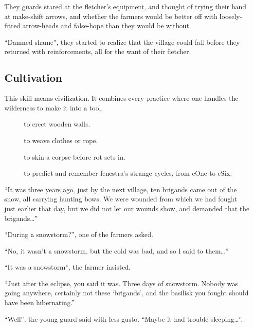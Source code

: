 \begin{multicols}{2}
\begin{exampletext}
  They \glspl{guard} stared at the fletcher's equipment, and thought of trying their hand at make-shift arrows, and whether the farmers would be better off with loosely-fitted arrow-heads and false-hope than they would be without.

  ``Damned shame'', they started to realize that the \gls{village} could fall before they returned with reinforcements, all for the want of their fletcher.
\end{exampletext}

\subsection{Cultivation}

This \gls{skill} means civilization.
It combines every practice where one handles the wilderness to make it into a tool.

\begin{description}
  \item[]
    to erect wooden walls.
  \item[]
    to weave clothes or rope.
  \item[]
    to skin a corpse before rot sets in.
  \item[]
    to predict and remember \gls{fenestra}'s strange \glspl{cycle}, from \gls{cOne} to \gls{cSix}.
\end{description}

\begin{exampletext}
  ``It was three years ago, just by the next \gls{village}, ten brigands came out of the snow, all carrying hunting bows.
  We were wounded from  which we had fought just earlier that day, but we did not let our wounds show, and demanded that the brigands\ldots''

  ``During a snowstorm?'', one of the farmers asked.

  ``No, it wasn't a snowstorm, but the cold was bad, and so I said to them\ldots''

  ``It was a snowstorm'', the farmer insisted.

  ``Just after the eclipse, you said it was.
  Three days of snowstorm.
  Nobody was going anywhere, certainly not these `brigands', and the \gls{basilisk} you fought should have been hibernating.''

  ``Well'', the young \gls{guard} said with less gusto.
  ``Maybe it had trouble sleeping\ldots''.
\end{exampletext}


\end{multicols}
